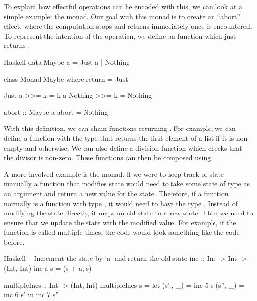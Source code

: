 To explain how effectful operations can be encoded with this, we can look at a simple example: the  monad. Our goal with this monad is to create an ``abort'' effect, where the computation stops and returns immediately once  is encountered. To represent the intention of the operation, we define an  function which just returns .

\begin{lst}{Haskell}
data Maybe a
  = Just a
  | Nothing

class Monad Maybe where
  return = Just
  
  Just a  >>= k = k a
  Nothing >>= k = Nothing

abort :: Maybe a
abort = Nothing
\end{lst}

\noindent With this definition, we can chain functions returning . For example, we can define a  function with the type  that returns the first element of a list if it is non-empty and  otherwise. We can also define a division function which checks that the divisor is non-zero. These functions can then be composed using \hs{>>=}.


\noindent A more involved example is the  monad. If we were to keep track of state manually a function that modifies state would need to take some state of type  as an argument and return a new value for the state. Therefore, if a function  normally is a function with type , it would need to have the type . Instead of modifying the state directly, it maps an old state to a new state. Then we need to ensure that we update the state with the modified value. For example, if the function is called multiple times, the code would look something like the code before.

\begin{lst}{Haskell}
-- Increment the state by `a` and return the old state
inc :: Int -> Int -> (Int, Int)
inc a s = (s + a, s)

multipleIncs :: Int -> (Int, Int)
multipleIncs s = let
  (s' , _) = inc 5 s
  (s'', _) = inc 6 s'
  in inc 7 s''
\end{lst}

